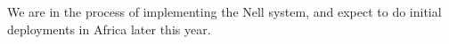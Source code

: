 \documentclass[preprint]{sig-alternate}
\begin{document}
We are in the process of implementing the Nell system, and expect to
do initial deployments in Africa later this year.



%

%
%
\balancecolumns
\end{document}
